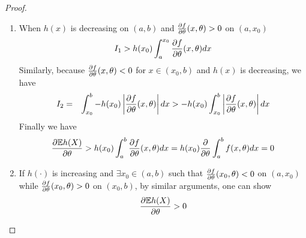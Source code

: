 \documentclass[11pt,a4]{amsart}
\newcommand{\pd}{\partial}
\newcommand{\E }{{\mathbb E}}
\newcommand{\1}{{\mathbf 1}}
\begin{document}
\begin{proof}
  \begin{enumerate}
  \item When $h(x)$ is decreasing on $(a, b)$ and ${\pd f \over \pd
    \theta}(x, \theta) > 0$ on $(a, x_0)$
    \[
    I_1 > h(x_0) \int_a^{x_0}
    {\pd f \over \pd \theta}(x, \theta) dx
    \]
    Similarly, because ${\pd f \over \pd \theta}(x, \theta) < 0$ for
    $x \in (x_0, b)$ and $h(x)$ is decreasing, we have
    \begin{eqnarray*}
      I_2 &=& \int_{x_0}^b -h(x_0)
      \left|{\pd f \over \pd \theta}(x, \theta) \right| dx
      > -h(x_0)
      \int_{x_0}^b \left| 
        {\pd f \over \pd \theta}(x, \theta)
      \right| dx
    \end{eqnarray*}
    Finally we have
    \begin{eqnarray*}
      {\pd \E h(X) \over \pd \theta}
      > h(x_0) \int_a^b
      {\pd f \over \pd \theta}(x, \theta) dx
      = h(x_0) {\partial \over \partial \theta}
      \int_a^b f(x, \theta) dx
      = 0
    \end{eqnarray*}
  \item If $h(\cdot)$ is increasing and $\exists x_0 \in (a, b)$ such that 
    ${\pd f \over \pd \theta}(x_0, \theta) < 0$ on $(a, x_0)$  while
    ${\pd f \over \pd \theta}(x_0, \theta) > 0$ on $(x_0, b)$, 
    by similar arguments, one can show
    \[
    {\pd \E h(X) \over \pd \theta}> 0
    \]
\end{enumerate}
\end{proof}
\end{document}
